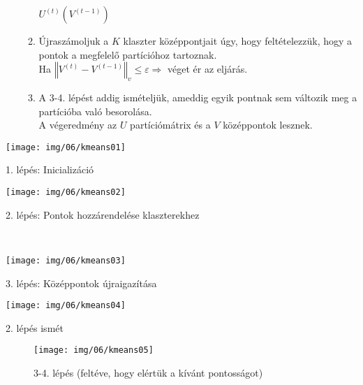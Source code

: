 \documentclass[a4paper, 11pt]{article}
\newcommand\norm[1]{\left\Vert#1\right\Vert}
\begin{document}
\begin{itemize}
\begin{enumerate}[1. lépés:]
		$ U^{(t)}(V^{(t-1)}) $
		\item Újraszámoljuk a $K$ klaszter középpontjait úgy, hogy feltételezzük, hogy a pontok a megfelelő partícióhoz tartoznak. \\
		Ha $\norm{V^{(t)} - V^{(t-1)}}_v \leq \varepsilon \Longrightarrow$ véget ér az eljárás.
		\item A 3-4. lépést addig ismételjük, ameddig egyik pontnak sem változik meg a partícióba való besorolása. \\
		A végeredmény az $U$ partíciómátrix és a $V$ középpontok lesznek.
	\end{enumerate}
\end{itemize}

\begin{minipage}{0.5\linewidth}
	\centering
	\texttt{[image: img/06/kmeans01]}
	
	{1. lépés: Inicializáció}
\end{minipage}
\begin{minipage}{0.5\linewidth}
	\centering
	\texttt{[image: img/06/kmeans02]}
	
	{2. lépés: Pontok hozzárendelése klaszterekhez}
\end{minipage}

~\\

\begin{minipage}{0.5\linewidth}
	\centering
	\texttt{[image: img/06/kmeans03]}
	
	3. lépés: Középpontok újraigazítása
\end{minipage}
\begin{minipage}{0.5\linewidth}
	\centering
	\texttt{[image: img/06/kmeans04]}
	
	2. lépés ismét
\end{minipage}


\begin{figure}[h]
	\centering
	\texttt{[image: img/06/kmeans05]}
	
	{3-4. lépés (feltéve, hogy elértük a kívánt pontosságot)}
\end{figure}
\end{document}
